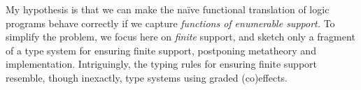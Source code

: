 \documentclass[sigplan,screen,dvipsnames,fleqn]{acmart}
\newcommand{\todo}[1]{{\color{ACMRed}#1}}
\newcommand\<\;                 %
\begin{document}
My hypothesis is that we can make the na\"ive functional translation of logic programs behave correctly if we capture \emph{functions of enumerable support.}
%
To simplify the problem, we focus here on \emph{finite} support, and sketch only a fragment of a type system for ensuring finite support, postponing metatheory and implementation.
%
Intriguingly, the typing rules for ensuring finite support resemble, though inexactly, type systems using graded (co)effects.



\end{document}
